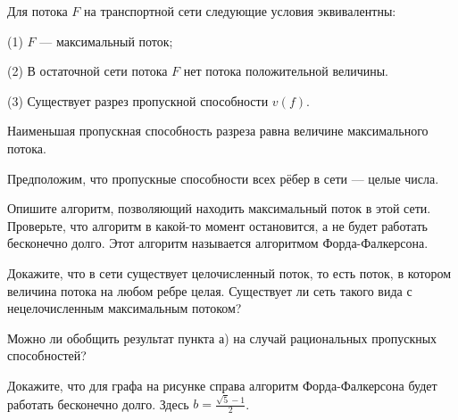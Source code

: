 \documentclass[a4paper,12pt]{article}
\newcommand{\0}[1]{\overline{#1}}
\begin{document}
\vspace{3.5cm}

 Для потока $F$ на транспортной сети следующие условия эквивалентны:

(1) $F$ --- максимальный поток;

(2) В остаточной сети потока $F$ нет потока положительной величины.

(3) Существует разрез пропускной способности $v(f)$.


 Наименьшая пропускная способность разреза равна величине максимального потока.


 Предположим, что пропускные способности всех рёбер в сети --- целые числа.

 Опишите алгоритм, позволяющий находить максимальный поток в этой сети. Проверьте, что алгоритм в какой-то момент остановится, а не будет работать бесконечно долго. Этот алгоритм называется алгоритмом Форда-Фалкерсона.

 Докажите, что в сети существует целочисленный поток, то есть поток, в котором величина потока на любом ребре целая.
 Существует ли сеть такого вида с нецелочисленным 
максимальным потоком?

 Можно ли обобщить результат пункта а) на случай рациональных пропускных способностей?




 Докажите, что для графа на рисунке справа алгоритм Форда-Фалкерсона будет работать бесконечно долго. Здесь $b = \frac{\sqrt{5}-1}{2}$. 


\vspace{-4cm}
\hspace{11.5cm}

{}
\end{document}
